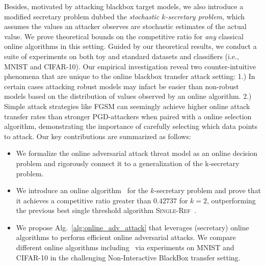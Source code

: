 Besides, motivated by attacking blackbox target models, we also introduce a modified secretary problem dubbed the \textit{stochastic $k$-secretary problem}, which assumes the values an attacker observes are stochastic estimates of the actual value. We prove theoretical bounds on the competitive ratio for \emph{any} classical online algorithms in this setting. Guided by our theoretical results, we conduct a suite of experiments on both toy and standard datasets and classifiers (i.e., MNIST and CIFAR-10). Our empirical investigation reveal two counter-intuitive phenomena that are unique to the online blackbox transfer attack setting: 1.) In certain cases attacking robust models may infact be easier than non-robust models based on the distribution of values observed by an online algorithm. 2.) Simple attack strategies like FGSM can seemingly achieve higher online attack transfer rates than stronger PGD-attackers when paired with a online selection algorithm, demonstrating the importance of carefully selecting which data points to attack. Our key contributions are summarized as follows:



\begin{itemize}[noitemsep,topsep=0pt,parsep=0pt,partopsep=0pt,label={\large\textbullet},leftmargin=*]
\item We formalize the online adversarial attack threat model as an online decision problem and rigorously connect it to a generalization of the k-secretary problem.
\item We introduce an online algorithm \algoname\ for the $k$-secretary problem and prove that it achieves a competitive ratio greater than $0.42737$ for $k=2$, outperforming the previous best single threshold algorithm \textsc{Single-Ref}~\cite{albers2020new}. 
\item We propose Alg.~\ref{alg:online_adv_attack} that leverages (secretary) online algorithms to perform efficient online adversarial attacks. We compare different online algorithms including \algoname\ via experiments on MNIST and CIFAR-10 in the challenging Non-Interactive BlackBox transfer setting.%
\end{itemize}

